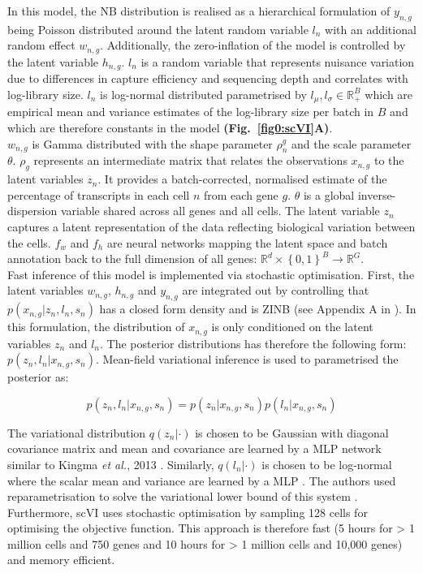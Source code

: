 \vspace{1cm}

In this model, the NB distribution is realised as a hierarchical formulation of $y_{n,g}$ being Poisson distributed around the latent random variable $l_n$ with an additional random effect $w_{n,g}$. Additionally, the zero-inflation of the model is controlled by the latent variable $h_{n,g}$. $l_n$ is a random variable that represents nuisance variation due to differences in capture efficiency and sequencing depth and correlates with log-library size. $l_n$ is log-normal distributed parametrised by $l_\mu,l_\sigma\in\mathbb{R}^B_+$ which are empirical mean and variance estimates of the log-library size per batch in $B$ and which are therefore constants in the model \textbf{(Fig.~\ref{fig0:scVI}A)}.\\

$w_{n,g}$ is Gamma distributed with the shape parameter $\rho_n^g$ and the scale parameter $\theta$. $\rho_g$ represents an intermediate matrix that relates the observations $x_{n,g}$ to the latent variables $z_n$. It provides a batch-corrected, normalised estimate of the percentage of transcripts in each cell $n$ from each gene $g$. $\theta$ is a global inverse-dispersion variable shared across all genes and all cells. The latent variable $z_n$ captures a latent representation of the data reflecting biological variation between the cells. $f_w$ and $f_h$ are neural networks mapping the latent space and batch annotation back to the full dimension of all genes: $\mathbb{R}^d\times{}\left\lbrace0,1\right\rbrace^B\rightarrow\mathbb{R}^G$.\\

Fast inference of this model is implemented via stochastic optimisation. First, the latent variables $w_{n,g}$, $h_{n,g}$ and $y_{n,g}$ are integrated out by controlling that $p(x_{n,g}|z_n,l_n,s_n)$ has a closed form density and is ZINB (see Appendix A in \citep{Lopez2018}). In this formulation, the distribution of $x_{n,g}$ is only conditioned on the latent variables $z_n$ and $l_n$. The posterior distributions has therefore the following form: $p(z_n,l_n|x_{n,g},s_n)$. Mean-field variational inference is used to parametrised the posterior as:

\begin{equation}
p(z_n,l_n|x_{n,g},s_n)=p(z_n|x_{n,g},s_n)p(l_n|x_{n,g},s_n)
\end{equation} 

The variational distribution $q(z_n|\cdot)$ is chosen to be Gaussian with diagonal covariance matrix and mean and covariance are learned by a \gls{MLP} network similar to Kingma \emph{et al.}, 2013 \citep{Kingma2013}. Similarly, $q(l_n|\cdot)$ is chosen to be log-normal where the scalar mean and variance are learned by a MLP \citep{Kingma2013}. The authors used reparametrisation to solve the variational lower bound of this system \cite{Lopez2018, Kingma2013}. Furthermore, scVI uses stochastic optimisation by sampling 128 cells for optimising the objective function. This approach is therefore fast (5 hours for > 1 million cells and 750 genes and 10 hours for > 1 million cells and 10,000 genes) and memory efficient. \\

